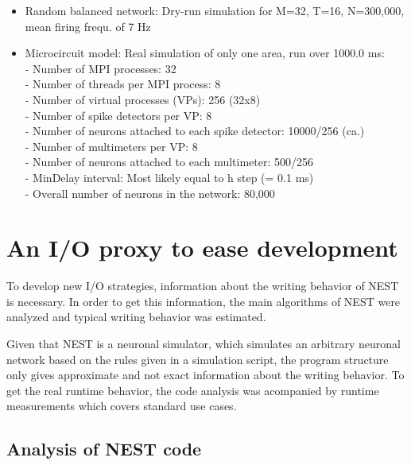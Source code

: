 \documentclass[]{YIC2015}
\begin{document}
\begin{itemize}
  \item{Random balanced network: Dry-run simulation for M=32, T=16, N=300,000, mean firing frequ. of 7 Hz}
  \item{Microcircuit model: Real simulation of only one area, run over 1000.0 ms: \\
- Number of MPI processes: 32\\
- Number of threads per MPI process: 8\\
- Number of virtual processes (VPs): 256 (32x8)\\
- Number of spike detectors per VP: 8\\
- Number of neurons attached to each spike detector: 10000/256 (ca.)\\
- Number of multimeters per VP: 8\\
- Number of neurons attached to each multimeter: 500/256\\
- MinDelay interval: Most likely equal to h step (= 0.1 ms)\\
- Overall number of neurons in the network: 80,000}
\end{itemize}

\section{An I/O proxy to ease development}

To develop new I/O strategies, information about the writing behavior
of NEST is necessary. In order to get this information, the main
algorithms of NEST were analyzed and typical writing behavior was
estimated.

Given that NEST is a neuronal simulator, which simulates an arbitrary
neuronal network based on the rules given in a simulation script, the
program structure only gives approximate and not exact information
about the writing behavior. To get the real runtime behavior, the code
analysis was acompanied by runtime measurements which covers standard
use cases.

\subsection{Analysis of NEST code}

\end{document}
